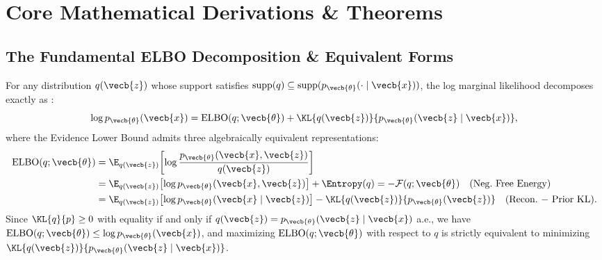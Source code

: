 \documentclass[../../../../master.tex]{subfiles}
\begin{document}
\section{Core Mathematical Derivations \& Theorems}

\subsection{The Fundamental ELBO Decomposition \& Equivalent Forms}

\begin{coremath}
For any distribution $q(\vecb{z})$ whose support satisfies $\mathrm{supp}(q) \subseteq \mathrm{supp}(p_{\vecb{\theta}}(\cdot \mid \vecb{x}))$, the log marginal likelihood decomposes exactly as  :
\begin{equation}
  \log p_{\vecb{\theta}}(\vecb{x}) = \mathrm{ELBO}(q; \vecb{\theta}) + \KL{q(\vecb{z})}{p_{\vecb{\theta}}(\vecb{z} \mid \vecb{x})},
  \label{eq:vi:elbo-decomp}
\end{equation}
where the Evidence Lower Bound admits three algebraically equivalent representations:
\begin{align}
  \mathrm{ELBO}(q; \vecb{\theta}) &= \E_{q(\vecb{z})}\!\left[\log \frac{p_{\vecb{\theta}}(\vecb{x}, \vecb{z})}{q(\vecb{z})}\right] \label{eq:vi:elbo-ratio} \\
  &= \E_{q(\vecb{z})}\!\left[\log p_{\vecb{\theta}}(\vecb{x}, \vecb{z})\right] + \Entropy(q) = -\mathcal{F}(q; \vecb{\theta}) \quad\text{(Neg.\ Free Energy)} \label{eq:vi:elbo-energy} \\
  &= \E_{q(\vecb{z})}\!\left[\log p_{\vecb{\theta}}(\vecb{x} \mid \vecb{z})\right] - \KL{q(\vecb{z})}{p_{\vecb{\theta}}(\vecb{z})} \quad\text{(Recon.\ $-$ Prior KL)}. \label{eq:vi:elbo-recon}
\end{align}
Since $\KL{q}{p} \ge 0$ with equality if and only if $q(\vecb{z}) = p_{\vecb{\theta}}(\vecb{z} \mid \vecb{x})$ a.e., we have $\mathrm{ELBO}(q; \vecb{\theta}) \le \log p_{\vecb{\theta}}(\vecb{x})$, and maximizing $\mathrm{ELBO}(q; \vecb{\theta})$ with respect to $q$ is strictly equivalent to minimizing $\KL{q(\vecb{z})}{p_{\vecb{\theta}}(\vecb{z} \mid \vecb{x})}$.
\end{coremath}
\end{document}
